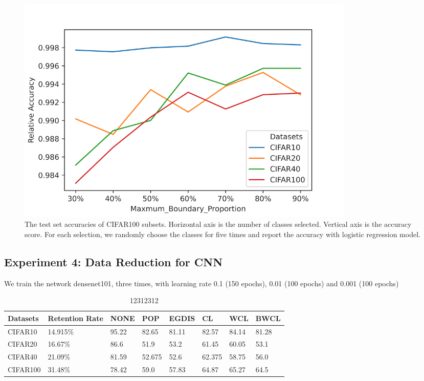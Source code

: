 \begin{figure}[H]
 \centering
 \includegraphics[width=0.8\textwidth]{src/bwcl_relative_size04.png}
 \caption{The test set accuracies of CIFAR100 subsets. Horizontal axis is the number of classes selected. Vertical axis is the accuracy score. For each selection, we randomly choose the classes for five times and report the accuracy with logistic regression model.}
 \label{Fig.logistic_subsets}
 \end{figure}

\subsection{Experiment 4: Data Reduction for CNN}
We train the network densenet101, three times, with learning rate 0.1 (150 epochs), 0.01 (100 epochs) and 0.001 (100 epochs)

\begin{table}[H]
    \centering
    \begin{tabular}{|l|l|l|l|l|l|l|l|}
    \hline
        Datasets & Retention Rate  & NONE & POP & EGDIS & CL & WCL & BWCL \\ \hline
        CIFAR10 & 14.915\% & 95.22 & 82.65 & 81.11 & 82.57 & 84.14 & 81.28 \\ \hline
        CIFAR20 & 16.67\% & 86.6 & 51.9 & 53.2 & 61.45 & 60.05 & 53.1 \\ \hline
        CIFAR40 & 21.09\% & 81.59 & 52.675 & 52.6 & 62.375 & 58.75 & 56.0 \\ \hline
        CIFAR100 & 31.48\% & 78.42 & 59.0 & 57.83 & 64.87 & 65.27 & 64.5 \\ \hline
    \end{tabular}
    \caption{12312312}
    \label{132e3213}
\end{table}


